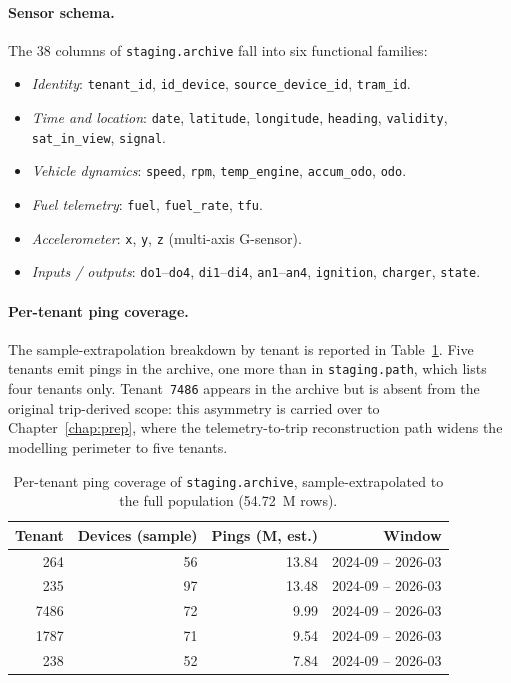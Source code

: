 \paragraph{Sensor schema.}
The 38 columns of \texttt{staging.archive} fall into six functional families:
\begin{itemize}
  \item \emph{Identity}: \texttt{tenant\_id}, \texttt{id\_device}, \texttt{source\_device\_id}, \texttt{tram\_id}.
  \item \emph{Time and location}: \texttt{date}, \texttt{latitude}, \texttt{longitude}, \texttt{heading}, \texttt{validity}, \texttt{sat\_in\_view}, \texttt{signal}.
  \item \emph{Vehicle dynamics}: \texttt{speed}, \texttt{rpm}, \texttt{temp\_engine}, \texttt{accum\_odo}, \texttt{odo}.
  \item \emph{Fuel telemetry}: \texttt{fuel}, \texttt{fuel\_rate}, \texttt{tfu}.
  \item \emph{Accelerometer}: \texttt{x}, \texttt{y}, \texttt{z} (multi-axis G-sensor).
  \item \emph{Inputs / outputs}: \texttt{do1}--\texttt{do4}, \texttt{di1}--\texttt{di4}, \texttt{an1}--\texttt{an4}, \texttt{ignition}, \texttt{charger}, \texttt{state}.
\end{itemize}

\paragraph{Per-tenant ping coverage.}
The sample-extrapolation breakdown by tenant is reported in Table~\ref{tab:archive-tenants}. Five tenants emit pings in the archive, one more than in \texttt{staging.path}, which lists four tenants only. Tenant~\texttt{7486} appears in the archive but is absent from the original trip-derived scope: this asymmetry is carried over to Chapter~\ref{chap:prep}, where the telemetry-to-trip reconstruction path widens the modelling perimeter to five tenants.

\begin{table}[h]
\centering
\caption{Per-tenant ping coverage of \texttt{staging.archive}, sample-extrapolated to the full population (54.72~M rows).}
\label{tab:archive-tenants}
\begin{tabular}{|r|r|r|r|}
\hline
\textbf{Tenant} & \textbf{Devices (sample)} & \textbf{Pings (M, est.)} & \textbf{Window} \\
\hline
264   & 56 & 13.84 & 2024-09 -- 2026-03 \\
235   & 97 & 13.48 & 2024-09 -- 2026-03 \\
7486  & 72 &  9.99 & 2024-09 -- 2026-03 \\
1787  & 71 &  9.54 & 2024-09 -- 2026-03 \\
238   & 52 &  7.84 & 2024-09 -- 2026-03 \\
\hline
\end{tabular}
\end{table}

